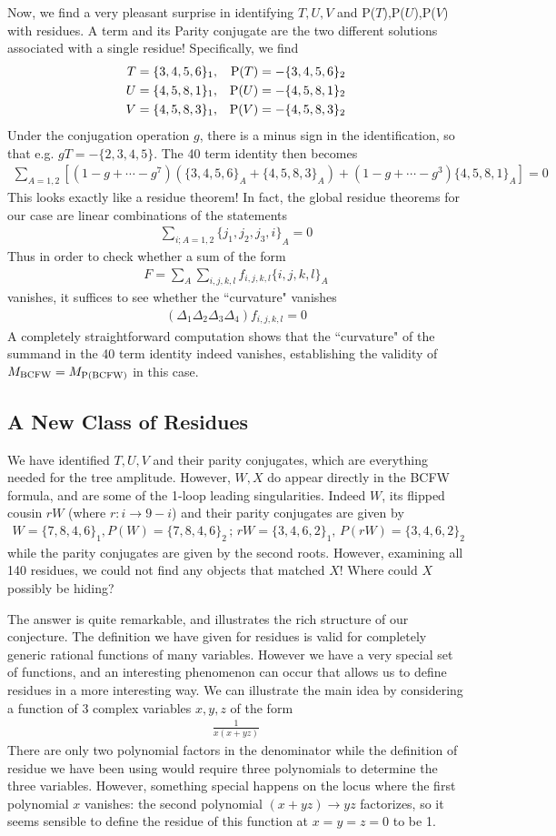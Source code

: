 \documentclass[12pt]{article}
\newcommand{\be}{\begin{eqnarray}}
\newcommand{\ee}{\end{eqnarray}}
\begin{document}
Now, we find a very pleasant surprise in identifying $T,U,V$ and P($T$),P($U$),P($V$) with residues. A term and its Parity conjugate are the two different solutions associated with a single residue! Specifically, we find
\begin{eqnarray}
T = \{3,4,5,6\}_1 &,& {\rm P}(T) = - \{3,4,5,6\}_2 \nonumber \\
U = \{4,5,8,1\}_1 &,& {\rm P}(U) = - \{4,5,8,1\}_2 \nonumber \\
V = \{4,5,8,3\}_1 &,& {\rm P}(V) = - \{4,5,8,3\}_2
\end{eqnarray}
Under the conjugation operation $g$, there is a minus sign in the
identification, so that e.g. $gT = -\{2,3,4,5\}$. The 40 term
identity then becomes
%
\be\nonumber \sum_{A=1,2} \left[(1 - g +
\cdots - g^7) \left({\{3,4,5,6\}}_A + {\{4,5,8,3\}}_A\right) + (1 -
g + \cdots - g^3) {\{4,5,8,1\}}_A\right] = 0
\ee
This looks exactly
like a residue theorem! In fact, the global residue theorems for our
case are linear combinations of the statements \be \sum_{i; A=1,2}
{\{j_1,j_2,j_3,i\}}_A = 0 \ee Thus in order to check whether a sum
of the form \be F = \sum_A \sum_{i,j,k,l} f_{i,j,k,l}
{\{i,j,k,l\}}_A \ee vanishes, it suffices to see whether the
``curvature"  vanishes \be (\Delta_1 \Delta_2 \Delta_3 \Delta_4)
f_{i,j,k,l} = 0 \ee A completely straightforward computation shows
that the ``curvature" of the summand in the 40 term identity indeed
vanishes, establishing the validity of $M_{{\rm BCFW}} =
M_{{\rm P(BCFW)}}$ in this case.

\subsection{A New Class of Residues}
We have identified $T,U,V$ and their parity conjugates, which are
everything needed for the tree amplitude. However, $W,X$ do appear
directly in the BCFW formula, and are some of the 1-loop leading
singularities. Indeed $W$, its flipped cousin $rW$ (where $r: i \to
9 - i$) and their parity conjugates are given by \be W =
\{7,8,4,6\}_1, P(W) = \{7,8,4,6\}_2 \, ; \, rW = \{3,4,6,2\}_1, \,
P(rW) = \{3,4,6,2\}_2 \ee while the parity conjugates are given by
the second roots. However, examining all 140 residues, we could not
find any objects that matched $X$! Where could $X$ possibly be
hiding?

The answer is quite remarkable, and illustrates the rich structure of our conjecture. The definition we have given for residues is valid for completely generic rational functions of many variables. However we have a very special set of functions, and an interesting phenomenon can occur that allows us to define residues in a more interesting way. We can illustrate the main idea by
considering a  function of 3 complex variables $x,y,z$ of the form
\be
\frac{1}{x(x+ yz)}
\ee
There are only two polynomial factors in the denominator while the definition of residue we have been using would require three polynomials to determine the three variables.  However, something special happens on the locus where the first polynomial $x$ vanishes: the second polynomial $(x + y z) \to yz$ factorizes, so it seems sensible to define the residue of this function at $x=y=z=0$ to be 1.
\end{document}
